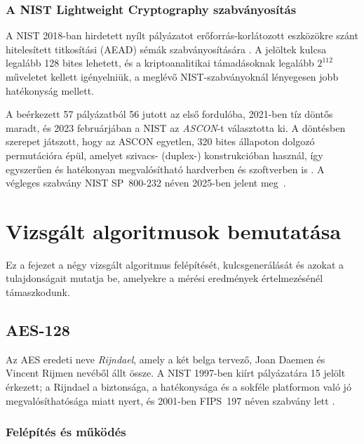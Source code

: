 \documentclass[a4paper,12pt]{report}
\theoremstyle{definition}
\theoremstyle{remark}
\begin{document}
\subsection{A NIST Lightweight Cryptography szabványosítás}

A NIST 2018-ban hirdetett nyílt pályázatot erőforrás-korlátozott eszközökre szánt hitelesített titkosítási (AEAD) sémák szabványosítására \cite{NISTLWC2023}. A jelöltek kulcsa legalább 128 bites lehetett, és a kriptoanalitikai támadásoknak legalább $2^{112}$ műveletet kellett igényelniük, a meglévő NIST-szabványoknál lényegesen jobb hatékonyság mellett.

A beérkezett 57 pályázatból 56 jutott az első fordulóba, 2021-ben tíz döntős maradt, és 2023 februárjában a NIST az \emph{ASCON}-t választotta ki. A döntésben szerepet játszott, hogy az ASCON egyetlen, 320 bites állapoton dolgozó permutációra épül, amelyet szivacs- (duplex-) konstrukcióban használ, így egyszerűen és hatékonyan megvalósítható hardverben és szoftverben is \cite{Dobraunig2021}. A végleges szabvány NIST SP~800-232 néven 2025-ben jelent meg~\cite{NISTSP800232}.

\chapter{Vizsgált algoritmusok bemutatása}\label{chap:algoritmusok}

Ez a fejezet a négy vizsgált algoritmus felépítését, kulcsgenerálását és azokat a tulajdonságait mutatja be, amelyekre a mérési eredmények értelmezésénél támaszkodunk.

\section{AES-128}\label{sec:aes}

Az AES eredeti neve \emph{Rijndael}, amely a két belga tervező, Joan Daemen és Vincent Rijmen nevéből állt össze. A NIST 1997-ben kiírt pályázatára 15 jelölt érkezett; a Rijndael a biztonsága, a hatékonysága és a sokféle platformon való jó megvalósíthatósága miatt nyert, és 2001-ben FIPS~197 néven szabvány lett \cite{FIPS197,DaemenRijmen2002}.

\subsection{Felépítés és működés}\label{sec:aes_struktura}
\end{document}
